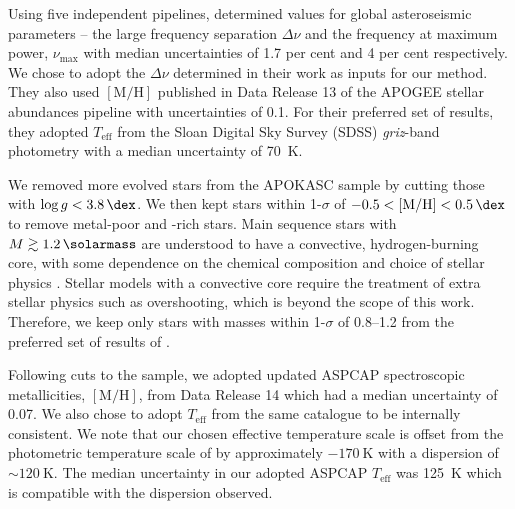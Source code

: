 \documentclass[a4paper,fleqn,usenatbib]{mnras}
\newcommand{\numax}{\ensuremath{{\nu_\mathrm{max}}}}
\newcommand{\dnu}{\ensuremath{\Delta\nu}}
\newcommand{\metallicity}{\ensuremath{[\mathrm{M}/\mathrm{H}]}}
\newcommand{\teff}{\ensuremath{T_\mathrm{eff}}}
\begin{document}
Using five independent pipelines,  determined values for global asteroseismic parameters -- the large frequency separation $\dnu$ and the frequency at maximum power, $\numax$ with median uncertainties of 1.7 per cent and 4 per cent respectively. We chose to adopt the $\dnu$ determined in their work as inputs for our method. They also used $\metallicity$ published in Data Release 13 \citep[DR13;][]{Albareti.AllendePrieto.ea2017} of the APOGEE stellar abundances pipeline \citep[ASPCAP;][]{GarciaPerez.AllendePrieto.ea2016} with uncertainties of \SI{0.1}{\dex}. For their preferred set of results, they adopted $\teff$ from the Sloan Digital Sky Survey (SDSS) \emph{griz}-band photometry \citep{Pinsonneault.An.ea2012} with a median uncertainty of \SI{70}{\kelvin}.

We removed more evolved stars from the APOKASC sample by cutting those with $\log g < \SI{3.8}{\dex}$. We then kept stars within 1-$\sigma$ of $-0.5 < \metallicity < \SI{0.5}{\dex}$ to remove metal-poor and -rich stars. Main sequence stars with $M \gtrsim \SI{1.2}{\solarmass}$ are understood to have a convective, hydrogen-burning core, with some dependence on the chemical composition and choice of stellar physics \citep{Appourchaux.Antia.ea2015}. Stellar models with a convective core require the treatment of extra stellar physics such as overshooting, which is beyond the scope of this work. Therefore, we keep only stars with masses within 1-$\sigma$ of \SIrange{0.8}{1.2}{\solarmass} from the preferred set of results of .

Following cuts to the sample, we adopted updated ASPCAP spectroscopic metallicities, \metallicity, from Data Release 14 \citep[DR14;][]{Blanton.Bershady.ea2017} which had a median uncertainty of \SI{0.07}{\dex}. We also chose to adopt $\teff$ from the same catalogue to be internally consistent. We note that our chosen effective temperature scale is offset from the photometric temperature scale of  by approximately $- \SI{170}{\kelvin}$ with a dispersion of $\sim \SI{120}{\kelvin}$. The median uncertainty in our adopted ASPCAP $\teff$ was \SI{125}{\kelvin} which is compatible with the dispersion observed.

\end{document}
